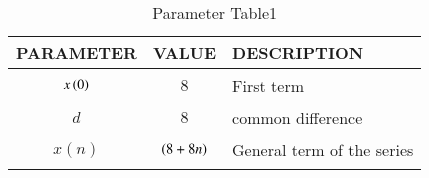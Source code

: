 \begin{table}[ht]
    \centering
    \def\arraystretch{1.5}
    \begin{tabular}{|p{2cm}|p{2.5cm}|p{2.3cm}|}
    \hline
    PARAMETER & VALUE & DESCRIPTION  \\ \hline
    $$x\left(0\right)$$ & $$8$$ & First term \\ \hline
    $$d$$ & $$8$$ & common difference \\ \hline
    $$x(n)$$ & $$\left(8+8n\right)$$ & General term of the series  \\ 
    \hline
  \end{tabular}
    \caption{Parameter Table1}
    \label{tab:10.5.3.1}
\end{table}

